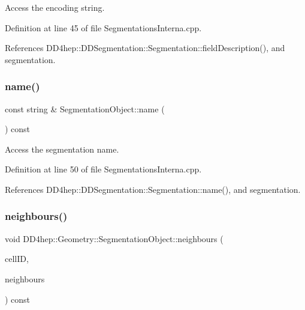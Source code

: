 Access the encoding string. 



Definition at line 45 of file Segmentations\+Interna.\+cpp.



References D\+D4hep\+::\+D\+D\+Segmentation\+::\+Segmentation\+::field\+Description(), and segmentation.

\hypertarget{class_d_d4hep_1_1_geometry_1_1_segmentation_object_ae1e4b47501b2e0c27c7299abc19467b3}{}\label{class_d_d4hep_1_1_geometry_1_1_segmentation_object_ae1e4b47501b2e0c27c7299abc19467b3} 
\subsubsection{\texorpdfstring{name()}{name()}}
{\footnotesize\ttfamily const string \& Segmentation\+Object\+::name (\begin{DoxyParamCaption}{ }\end{DoxyParamCaption}) const}



Access the segmentation name. 



Definition at line 50 of file Segmentations\+Interna.\+cpp.



References D\+D4hep\+::\+D\+D\+Segmentation\+::\+Segmentation\+::name(), and segmentation.

\hypertarget{class_d_d4hep_1_1_geometry_1_1_segmentation_object_a349b5276d48d2aec11b25c98a52f6900}{}\label{class_d_d4hep_1_1_geometry_1_1_segmentation_object_a349b5276d48d2aec11b25c98a52f6900} 
\subsubsection{\texorpdfstring{neighbours()}{neighbours()}}
{\footnotesize\ttfamily void D\+D4hep\+::\+Geometry\+::\+Segmentation\+Object\+::neighbours (\begin{DoxyParamCaption}\item[{const Cell\+ID \&}]{cell\+ID,  }\item[{std\+::set$<$ Cell\+ID $>$ \&}]{neighbours }\end{DoxyParamCaption}) const}



